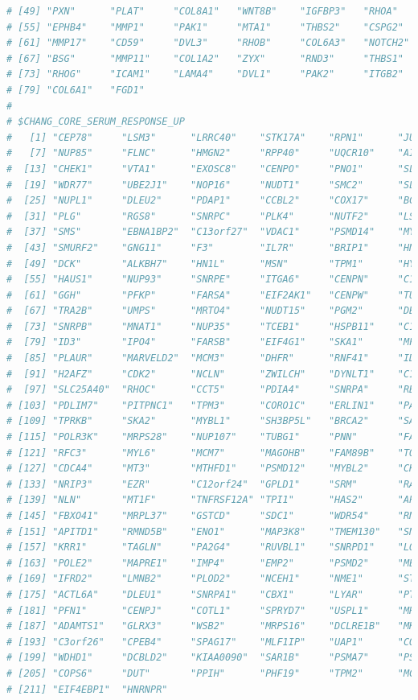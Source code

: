 \documentclass[
  12pt,
]{book}
\begin{document}
\begin{lstlisting}[language=R]
# [49] "PXN"      "PLAT"     "COL8A1"   "WNT8B"    "IGFBP3"   "RHOA"    
# [55] "EPHB4"    "MMP1"     "PAK1"     "MTA1"     "THBS2"    "CSPG2"   
# [61] "MMP17"    "CD59"     "DVL3"     "RHOB"     "COL6A3"   "NOTCH2"  
# [67] "BSG"      "MMP11"    "COL1A2"   "ZYX"      "RND3"     "THBS1"   
# [73] "RHOG"     "ICAM1"    "LAMA4"    "DVL1"     "PAK2"     "ITGB2"   
# [79] "COL6A1"   "FGD1"    
# 
# $CHANG_CORE_SERUM_RESPONSE_UP
#   [1] "CEP78"     "LSM3"      "LRRC40"    "STK17A"    "RPN1"      "JUNB"     
#   [7] "NUP85"     "FLNC"      "HMGN2"     "RPP40"     "UQCR10"    "AIMP2"    
#  [13] "CHEK1"     "VTA1"      "EXOSC8"    "CENPO"     "PNO1"      "SLC16A1"  
#  [19] "WDR77"     "UBE2J1"    "NOP16"     "NUDT1"     "SMC2"      "SLC25A5"  
#  [25] "NUPL1"     "DLEU2"     "PDAP1"     "CCBL2"     "COX17"     "BCCIP"    
#  [31] "PLG"       "RGS8"      "SNRPC"     "PLK4"      "NUTF2"     "LSM4"     
#  [37] "SMS"       "EBNA1BP2"  "C13orf27"  "VDAC1"     "PSMD14"    "MYCBP"    
#  [43] "SMURF2"    "GNG11"     "F3"        "IL7R"      "BRIP1"     "HNRNPA2B1"
#  [49] "DCK"       "ALKBH7"    "HN1L"      "MSN"       "TPM1"      "HYLS1"    
#  [55] "HAUS1"     "NUP93"     "SNRPE"     "ITGA6"     "CENPN"     "C11orf24" 
#  [61] "GGH"       "PFKP"      "FARSA"     "EIF2AK1"   "CENPW"     "TUBA4A"   
#  [67] "TRA2B"     "UMPS"      "MRTO4"     "NUDT15"    "PGM2"      "DBNDD1"   
#  [73] "SNRPB"     "MNAT1"     "NUP35"     "TCEB1"     "HSPB11"    "C19orf48" 
#  [79] "ID3"       "IPO4"      "FARSB"     "EIF4G1"    "SKA1"      "MFSD11"   
#  [85] "PLAUR"     "MARVELD2"  "MCM3"      "DHFR"      "RNF41"     "ID2"      
#  [91] "H2AFZ"     "CDK2"      "NCLN"      "ZWILCH"    "DYNLT1"    "C16orf61" 
#  [97] "SLC25A40"  "RHOC"      "CCT5"      "PDIA4"     "SNRPA"     "RBM14"    
# [103] "PDLIM7"    "PITPNC1"   "TPM3"      "CORO1C"    "ERLIN1"    "PAICS"    
# [109] "TPRKB"     "SKA2"      "MYBL1"     "SH3BP5L"   "BRCA2"     "SAR1A"    
# [115] "POLR3K"    "MRPS28"    "NUP107"    "TUBG1"     "PNN"       "FAM167A"  
# [121] "RFC3"      "MYL6"      "MCM7"      "MAGOHB"    "FAM89B"    "TOMM40"   
# [127] "CDCA4"     "MT3"       "MTHFD1"    "PSMD12"    "MYBL2"     "CKLF"     
# [133] "NRIP3"     "EZR"       "C12orf24"  "GPLD1"     "SRM"       "RAB3B"    
# [139] "NLN"       "MT1F"      "TNFRSF12A" "TPI1"      "HAS2"      "APOO"     
# [145] "FBXO41"    "MRPL37"    "GSTCD"     "SDC1"      "WDR54"     "RNF138"   
# [151] "APITD1"    "RMND5B"    "ENO1"      "MAP3K8"    "TMEM130"   "SNX17"    
# [157] "KRR1"      "TAGLN"     "PA2G4"     "RUVBL1"    "SNRPD1"    "LOXL2"    
# [163] "POLE2"     "MAPRE1"    "IMP4"      "EMP2"      "PSMD2"     "MET"      
# [169] "IFRD2"     "LMNB2"     "PLOD2"     "NCEH1"     "NME1"      "STRA13"   
# [175] "ACTL6A"    "DLEU1"     "SNRPA1"    "CBX1"      "LYAR"      "PTPLB"    
# [181] "PFN1"      "CENPJ"     "COTL1"     "SPRYD7"    "USPL1"     "MRPL12"   
# [187] "ADAMTS1"   "GLRX3"     "WSB2"      "MRPS16"    "DCLRE1B"   "MKKS"     
# [193] "C3orf26"   "CPEB4"     "SPAG17"    "MLF1IP"    "UAP1"      "COQ2"     
# [199] "WDHD1"     "DCBLD2"    "KIAA0090"  "SAR1B"     "PSMA7"     "PSMC3"    
# [205] "COPS6"     "DUT"       "PPIH"      "PHF19"     "TPM2"      "MCTS1"    
# [211] "EIF4EBP1"  "HNRNPR"
\end{lstlisting}
\end{document}
